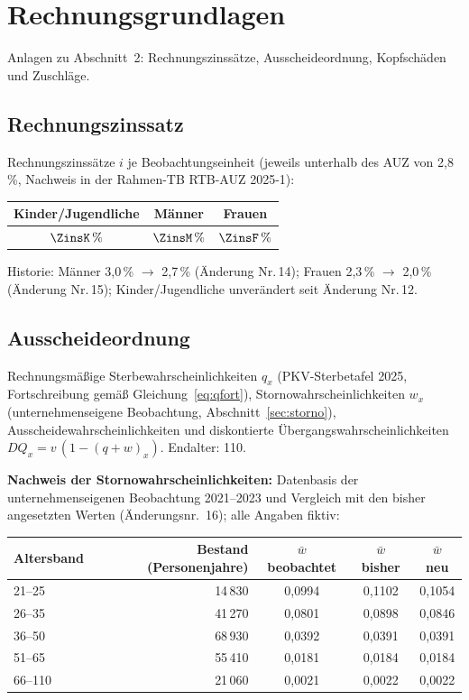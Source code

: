 \section{Rechnungsgrundlagen}\label{sec:anlagenteil2}

Anlagen zu Abschnitt~2: Rechnungszinssätze, Ausscheideordnung,
Kopfschäden und Zuschläge.

\subsection{Rechnungszinssatz}\label{sec:anlage21}

Rechnungszinssätze $i$ je Beobachtungseinheit (jeweils unterhalb des
AUZ von 2{,}8\,\%, Nachweis in der Rahmen-TB RTB-AUZ 2025-1):

\begin{center}
\begin{tabular}{ccc}
\toprule
Kinder/Jugendliche & Männer & Frauen \\
\midrule
$\ZinsK\,\%$ & $\ZinsM\,\%$ & $\ZinsF\,\%$ \\
\bottomrule
\end{tabular}
\end{center}

Historie: Männer 3{,}0\,\% $\to$ 2{,}7\,\% (Änderung Nr.\,14); Frauen
2{,}3\,\% $\to$ 2{,}0\,\% (Änderung Nr.\,15); Kinder/Jugendliche
unverändert seit Änderung Nr.\,12.

\subsection{Ausscheideordnung}\label{sec:anlage221}

Rechnungsmäßige Sterbewahrscheinlichkeiten $q_x$ (PKV-Sterbetafel 2025,
Fortschreibung gemäß Gleichung~\eqref{eq:qfort}),
Stornowahrscheinlichkeiten $w_x$ (unternehmenseigene Beobachtung,
Abschnitt~\ref{sec:storno}), Ausscheidewahrscheinlichkeiten und
diskontierte Übergangswahrscheinlichkeiten
$DQ_x = v\,(1-(q+w)_x)$. Endalter: 110.

\textbf{Nachweis der Stornowahrscheinlichkeiten:} Datenbasis der
unternehmenseigenen Beobachtung 2021--2023 und Vergleich mit den
bisher angesetzten Werten (Änderungsnr.~16); alle Angaben fiktiv:

\begin{center}\small
\begin{tabular}{@{}lrccc@{}}
\toprule
Altersband & Bestand (Personenjahre) & $\bar{w}$ beobachtet & $\bar{w}$ bisher & $\bar{w}$ neu \\
\midrule
21--25 & 14\,830 & 0{,}0994 & 0{,}1102 & 0{,}1054 \\
26--35 & 41\,270 & 0{,}0801 & 0{,}0898 & 0{,}0846 \\
36--50 & 68\,930 & 0{,}0392 & 0{,}0391 & 0{,}0391 \\
51--65 & 55\,410 & 0{,}0181 & 0{,}0184 & 0{,}0184 \\
66--110 & 21\,060 & 0{,}0021 & 0{,}0022 & 0{,}0022 \\
\bottomrule
\end{tabular}
\end{center}

